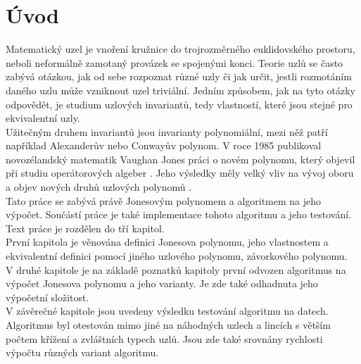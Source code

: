 \chapter*{Úvod}

Matematický uzel je vnoření kružnice do trojrozměrného euklidovského prostoru, neboli neformálně zamotaný provázek se spojenými konci. Teorie uzlů se často zabývá otázkou, jak od sebe rozpoznat různé uzly či jak určit, jestli rozmotáním daného uzlu může vzniknout uzel triviální. Jedním způsobem, jak na tyto otázky odpovědět, je studium uzlových invariantů, tedy vlastností, které jsou stejné pro ekvivalentní uzly.
\\
Užitečným druhem invariantů jsou invarianty polynomiální, mezi něž patří například Alexanderův nebo	 Conwayův polynom. 
V roce 1985 publikoval novozélandský matematik Vaughan Jones práci o novém polynomu, který objevil při studiu operátorových algeber  \cite{jones1985}. 
Jeho výsledky měly velký vliv na vývoj oboru a objev nových druhů uzlových polynomů \cite{cromwell2004knots}.
\\
Tato práce se zabývá právě Jonesovým polynomem a algoritmem na jeho výpočet. Součástí práce je také implementace tohoto algoritmu a jeho testování.
\\

Text práce je rozdělen do tří kapitol. 
\\
První kapitola je věnována definici Jonesova polynomu, jeho vlastnostem a ekvivalentní definici pomocí jiného uzlového polynomu, závorkového polynomu.
\\
V druhé kapitole je na základě poznatků kapitoly první odvozen algoritmus na výpočet Jonesova polynomu a jeho varianty. Je zde také odhadnuta jeho výpočetní složitost.
\\
V závěrečné kapitole jsou uvedeny výsledku testování algoritmu na datech. Algoritmus byl otestován mimo jiné na náhodných uzlech a lincích s větším počtem křížení a zvláštních typech uzlů. Jsou zde také srovnány rychlosti výpočtu různých variant algoritmu.

